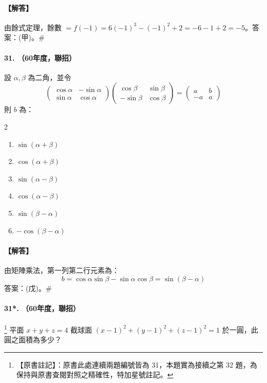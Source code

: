 \paragraph{【解答】}
由餘式定理，餘數 $= f(-1) = 6(-1)^3 - (-1)^2 + 2 = -6-1+2 = -5$。答案：(甲)。\hfill$\#$

\paragraph{31. （60年度，聯招）}
設 $\alpha, \beta$ 為二角，並令
\[ \begin{pmatrix} \cos\alpha & -\sin\alpha \\ \sin\alpha & \cos\alpha \end{pmatrix} \begin{pmatrix} \cos\beta & \sin\beta \\ -\sin\beta & \cos\beta \end{pmatrix} = \begin{pmatrix} a & b \\ -a & a \end{pmatrix} \]
則 $b$ 為：
\begin{multicols}{2}
\begin{enumerate}[label=\tiangan*]
  \item $\sin(\alpha+\beta)$
  \item $\cos(\alpha+\beta)$
  \item $\sin(\alpha-\beta)$
  \item $\cos(\alpha-\beta)$
  \item $\sin(\beta-\alpha)$
  \item $-\cos(\beta-\alpha)$
\end{enumerate}
\end{multicols}

\paragraph{【解答】}
由矩陣乘法，第一列第二行元素為：
\[ b = \cos\alpha\sin\beta - \sin\alpha\cos\beta = \sin(\beta-\alpha) \]
答案：(戊)。\hfill$\#$

\paragraph{31*. （60年度，聯招）}\label{note:b6s-ch4-p172-prob-dup}\footnote{【原書註記】：原書此處連續兩題編號皆為 31，本題實為接續之第 32 題，為保持與原書查閱對照之精確性，特加星號註記。}
平面 $x+y+z=4$ 截球面 $(x-1)^2+(y-1)^2+(z-1)^2=1$ 於一圓，此圓之面積為多少？

